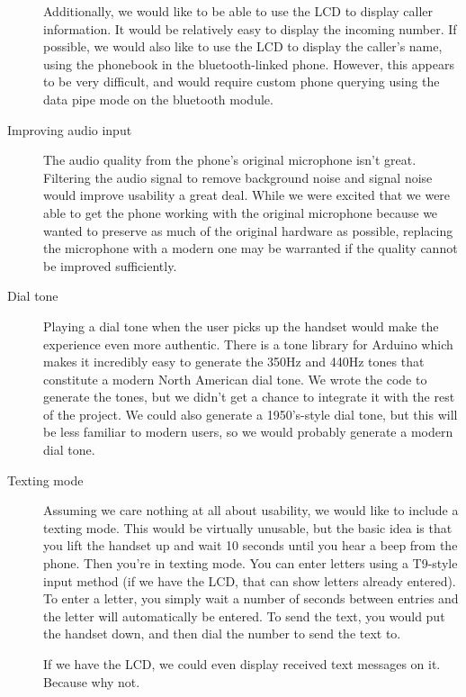\documentclass{es50report}
\begin{document}
\begin{description}
                Additionally, we would like to be able to use the LCD to display caller information. It would be relatively easy to display the incoming number. If possible, we would also like to use the LCD to display the caller's name, using the phonebook in the bluetooth-linked phone. However, this appears to be very difficult, and would require custom phone querying using the data pipe mode on the bluetooth module.
            \item[Improving audio input]
                The audio quality from the phone's original microphone isn't great. Filtering the audio signal to remove background noise and signal noise would improve usability a great deal. While we were excited that we were able to get the phone working with the original microphone because we wanted to preserve as much of the original hardware as possible, replacing the microphone with a modern one may be warranted if the quality cannot be improved sufficiently.
            \item[Dial tone]
                Playing a dial tone when the user picks up the handset would make the experience even more authentic. There is a tone library for Arduino which makes it incredibly easy to generate the 350Hz and 440Hz tones that constitute a modern North American dial tone. We wrote the code to generate the tones, but we didn't get a chance to integrate it with the rest of the project. We could also generate a 1950's-style dial tone, but this will be less familiar to modern users, so we would probably generate a modern dial tone.
            \item[Texting mode]
                Assuming we care nothing at all about usability, we would like to include a texting mode. This would be virtually unusable, but the basic idea is that you lift the handset up and wait 10 seconds until you hear a beep from the phone. Then you're in texting mode. You can enter letters using a T9-style input method (if we have the LCD, that can show letters already entered). To enter a letter, you simply wait a number of seconds between entries and the letter will automatically be entered. To send the text, you would put the handset down, and then dial the number to send the text to.

                If we have the LCD, we could even display received text messages on it. Because why not.
        \end{description}
\end{document}
